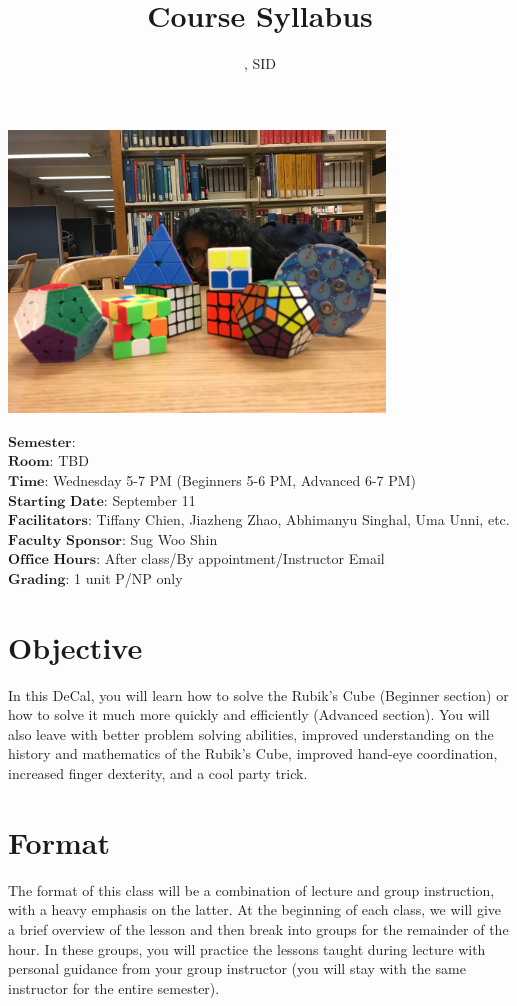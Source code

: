 \documentclass[11pt]{article}
\author{\Name, SID \SID}
\date{}
\begin{document}
\maketitle
\title{Course Syllabus}
\centerline{\includegraphics[width=10cm]{5.JPG}}

$\textbf{Semester}$: \semester\\
$\textbf{Room}$: TBD\\
$\textbf{Time}$: Wednesday 5-7 PM (Beginners 5-6 PM, Advanced 6-7 PM)\\
$\textbf{Starting Date}$: September 11\\
$\textbf{Facilitators}$: Tiffany Chien, Jiazheng Zhao, Abhimanyu Singhal, Uma Unni, etc.\\
$\textbf{Faculty Sponsor}$: Sug Woo Shin\\
$\textbf{Office Hours}$: After class/By appointment/Instructor Email \\
$\textbf{Grading}$: 1 unit P/NP only

\section*{Objective}
In this DeCal, you will learn how to solve the Rubik’s Cube (Beginner section) or how to solve it much more quickly and efficiently (Advanced section). You will also leave with better problem solving abilities, improved understanding on the history and mathematics of the Rubik’s Cube, improved hand-eye coordination, increased finger dexterity, and a cool party trick.


\section*{Format}
The format of this class will be a combination of lecture and group instruction, with a heavy emphasis on the latter. At the beginning of each class, we will give a brief overview of the lesson and then break into groups for the remainder of the hour. In these groups, you will practice the lessons taught during lecture with personal guidance from your group instructor (you will stay with the same instructor for the entire semester).
\end{document}
